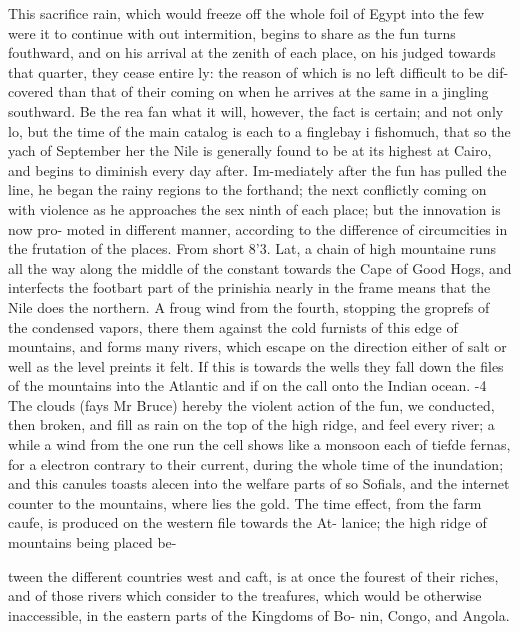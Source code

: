 This sacrifice rain, which would freeze off the whole foil of Egypt into the few were it to continue with out intermition, begins to share as the fun turns fouthward, and on his arrival at the zenith of each place, on his judged towards that quarter, they cease entire ly: the reason of which is no left difficult to be dif- covered than that of their coming on when he arrives at the same in a jingling southward. Be the rea fan what it will, however, the fact is certain; and not only lo, but the time of the main catalog is each to a finglebay i fishomuch, that so the yach of September her the Nile is generally found to be at its highest at Cairo, and begins to diminish every day after. Im-mediately after the fun has pulled the line, he began the rainy regions to the forthand; the next conflictly coming on with violence as he approaches the sex ninth of each place; but the innovation is now pro- moted in different manner, according to the difference of circumcities in the frutation of the places. From short 8’3. Lat, a chain of high mountaine runs all the way along the middle of the constant towards the Cape of Good Hogs, and interfects the footbart part of the prinishia nearly in the frame means that the Nile does the northern. A froug wind from the fourth, stopping the groprefs of the condensed vapors, there them against the cold furnists of this edge of mountains, and forms many rivers, which escape on the direction either of salt or well as the level preints it felt. If this is towards the wells they fall down the files of the mountains into the Atlantic and if on the call onto the Indian ocean. -4 The clouds (fays Mr Bruce) hereby the violent action of the fun, we conducted, then broken, and fill as rain on the top of the high ridge, and feel every river; a while a wind from the one run the cell shows like a monsoon each of tiefde fernas, for a electron contrary to their current, during the whole time of the inundation; and this canules toasts alecen into the welfare parts of so Sofials, and the internet counter to the mountains, where lies the gold. The time effect, from the farm caufe, is produced on the western file towards the At- lanice; the high ridge of mountains being placed be-\par\medskip
tween the different countries west and caft, is at once the fourest of their riches, and of those rivers which consider to the treafures, which would be otherwise inaccessible, in the eastern parts of the Kingdoms of Bo- nin, Congo, and Angola.\par\medskip
